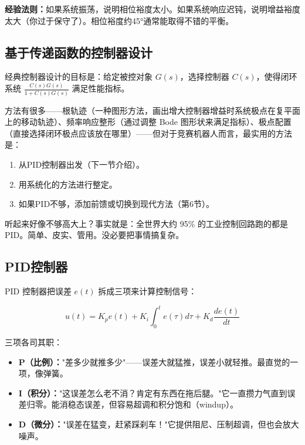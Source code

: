 \textbf{经验法则：}如果系统振荡，说明相位裕度太小。如果系统响应迟钝，说明增益裕度太大（你过于保守了）。相位裕度约45°通常能取得不错的平衡。

\subsection{基于传递函数的控制器设计}

经典控制器设计的目标是：给定被控对象 $G(s)$，选择控制器 $C(s)$，使得闭环系统 $\frac{C(s)G(s)}{1+C(s)G(s)}$ 满足性能指标。

方法有很多——根轨迹（一种图形方法，画出增大控制器增益时系统极点在复平面上的移动轨迹）、频率响应整形（通过调整 Bode 图形状来满足指标）、极点配置（直接选择闭环极点应该放在哪里）——但对于竞赛机器人而言，最实用的方法是：

\begin{enumerate}
    \item 从PID控制器出发（下一节介绍）。
    \item 用系统化的方法进行整定。
    \item 如果PID不够，添加前馈或切换到现代方法（第6节）。
\end{enumerate}

听起来好像不够高大上？事实就是：全世界大约 95\% 的工业控制回路跑的都是 PID。简单、皮实、管用。没必要把事情搞复杂。

\subsection{PID控制器}

PID 控制器把误差 $e(t)$ 拆成三项来计算控制信号：

\begin{equation}
u(t) = K_p e(t) + K_i \int_0^t e(\tau) d\tau + K_d \frac{de(t)}{dt}
\end{equation}

三项各司其职：

\begin{itemize}
    \item \textbf{P（比例）：}"差多少就推多少"——误差大就猛推，误差小就轻推。最直觉的一项，像弹簧。
    \item \textbf{I（积分）：}"这误差怎么老不消？肯定有东西在拖后腿。"它一直攒力气直到误差归零。能消稳态误差，但容易超调和积分饱和（windup）。
    \item \textbf{D（微分）：}"误差在猛变，赶紧踩刹车！"它提供阻尼、压制超调，但也会放大噪声。
\end{itemize}

